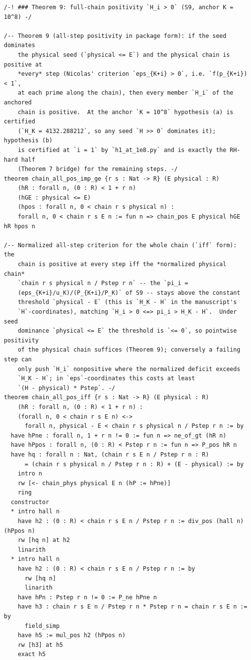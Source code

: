 \documentclass[11pt]{article}
\theoremstyle{remark}
\begin{document}
\begin{verbatim}
/-! ### Theorem 9: full-chain positivity `H_i > 0` (S9, anchor K = 10^8) -/

/-- Theorem 9 (all-step positivity in package form): if the seed dominates
    the physical seed (`physical <= E`) and the physical chain is positive at
    *every* step (Nicolas' criterion `eps_{K+i} > 0`, i.e. `f(p_{K+i}) < 1`,
    at each prime along the chain), then every member `H_i` of the anchored
    chain is positive.  At the anchor `K = 10^8` hypothesis (a) is certified
    (`H_K = 4132.288212`, so any seed `H >> 0` dominates it); hypothesis (b)
    is certified at `i = 1` by `h1_at_1e8.py` and is exactly the RH-hard half
    (Theorem 7 bridge) for the remaining steps. -/
theorem chain_all_pos_imp_ge {r s : Nat -> R} (E physical : R)
    (hR : forall n, (0 : R) < 1 + r n)
    (hGE : physical <= E)
    (hpos : forall n, 0 < chain r s physical n) :
    forall n, 0 < chain r s E n := fun n => chain_pos E physical hGE hR hpos n

/-- Normalized all-step criterion for the whole chain (`iff` form): the
    chain is positive at every step iff the *normalized physical chain*
    `chain r s physical n / Pstep r n` -- the `pi_i =
    (eps_{K+i}/u_K)/(P_{K+i}/P_K)` of S9 -- stays above the constant
    threshold `physical - E` (this is `H_K - H` in the manuscript's
    `H`-coordinates), matching `H_i > 0 <=> pi_i > H_K - H`.  Under seed
    dominance `physical <= E` the threshold is `<= 0`, so pointwise positivity
    of the physical chain suffices (Theorem 9); conversely a failing step can
    only push `H_i` nonpositive where the normalized deficit exceeds
    `H_K - H`; in `eps`-coordinates this costs at least
    `(H - physical) * Pstep`. -/
theorem chain_all_pos_iff {r s : Nat -> R} (E physical : R)
    (hR : forall n, (0 : R) < 1 + r n) :
    (forall n, 0 < chain r s E n) <->
      forall n, physical - E < chain r s physical n / Pstep r n := by
  have hPne : forall n, 1 + r n != 0 := fun n => ne_of_gt (hR n)
  have hPpos : forall n, (0 : R) < Pstep r n := fun n => P_pos hR n
  have hq : forall n : Nat, (chain r s E n / Pstep r n : R)
      = (chain r s physical n / Pstep r n : R) + (E - physical) := by
    intro n
    rw [<- chain_phys physical E n (hP := hPne)]
    ring
  constructor
  * intro hall n
    have h2 : (0 : R) < chain r s E n / Pstep r n := div_pos (hall n) (hPpos n)
    rw [hq n] at h2
    linarith
  * intro hall n
    have h2 : (0 : R) < chain r s E n / Pstep r n := by
      rw [hq n]
      linarith
    have hPn : Pstep r n != 0 := P_ne hPne n
    have h3 : chain r s E n / Pstep r n * Pstep r n = chain r s E n := by
      field_simp
    have h5 := mul_pos h2 (hPpos n)
    rw [h3] at h5
    exact h5


\end{verbatim}
\end{document}
